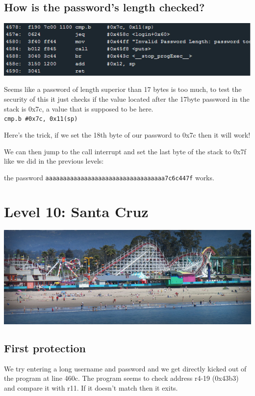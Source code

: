 \subsection{How is the password's length
checked?}\label{how-is-the-passwords-length-checked}

\includegraphics{img/9_1.PNG}

Seems like a password of length superior than 17 bytes is too much, to
test the security of this it just checks if the value located after the
17byte password in the stack is 0x7c, a value that is supposed to be
here.\\\texttt{cmp.b   \#0x7c, 0x11(sp)}

Here's the trick, if we set the 18th byte of our password to 0x7c then
it will work!

We can then jump to the call interrupt and set the last byte of the
stack to 0x7f like we did in the previous levels:

the password \texttt{aaaaaaaaaaaaaaaaaaaaaaaaaaaaaaaaaa7c6c447f} works.

\section{Level 10: Santa Cruz}\label{level-10-santa-cruz}

\includegraphics{img/10_5.PNG}

\subsection{First protection}\label{first-protection}

We try entering a long username and password and we get directly kicked
out of the program at line 460c. The program seems to check address
r4-19 (0x43b3) and compare it with r11. If it doesn't match then it
exits.

